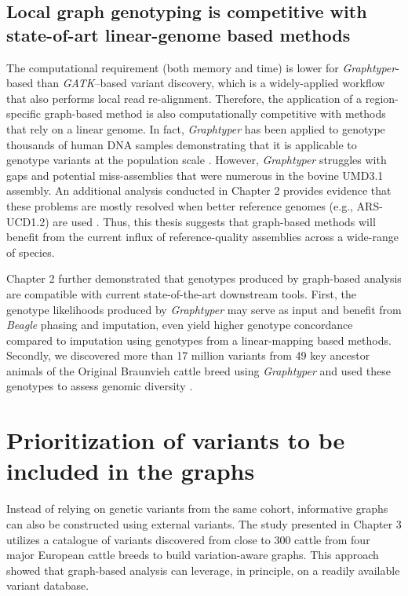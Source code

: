 \documentclass[../main.tex]{subfiles}
\begin{document}
\subsection*{Local graph genotyping is competitive with state-of-art linear-genome based methods}

The computational requirement (both memory and time) is lower for \emph{Graphtyper}-based than \emph{GATK}–based variant discovery, which is a widely-applied workflow that also performs local read re-alignment. Therefore, the application of a region-specific graph-based method is also computationally competitive with methods that rely on a linear genome. In fact, \emph{Graphtyper} has been applied to genotype thousands of human DNA samples demonstrating that it is applicable to genotype variants at the population scale \citep{eggertsson2017graphtyper,eggertsson2019graphtyper2}. However, \emph{Graphtyper} struggles with gaps and potential miss-assemblies that were numerous in the bovine UMD3.1 assembly. An additional analysis conducted in Chapter 2 provides evidence that these problems are mostly resolved when better reference genomes (e.g., ARS-UCD1.2) are used \citep{rosen2020novo}. Thus, this thesis suggests that graph-based methods will benefit from the current influx of reference-quality assemblies across a wide-range of species. 

Chapter 2 further demonstrated that genotypes produced by graph-based analysis are compatible with current state-of-the-art downstream tools. First, the genotype likelihoods produced by \emph{Graphtyper }may serve as input and benefit from \emph{Beagle} phasing and imputation, even yield higher genotype concordance compared to imputation using genotypes from a linear-mapping based methods. Secondly, we discovered more than 17 million variants from 49 key ancestor animals of the Original Braunvieh cattle breed using \emph{Graphtyper} and used these genotypes to assess genomic diversity \citep{bhati2020assessing}. 

\section{Prioritization of variants to be included in the graphs}

Instead of relying on genetic variants from the same cohort, informative graphs can also be constructed using external variants. The study presented in Chapter 3 utilizes a catalogue of variants discovered from close to 300 cattle from four major European cattle breeds to build variation-aware graphs. This approach showed that graph-based analysis can leverage, in principle, on a readily available variant database. 
\end{document}
